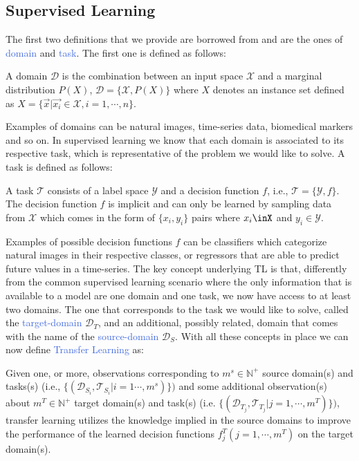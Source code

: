 \subsection{Supervised Learning}
The first two definitions that we provide are borrowed from \citet{zhuang2020comprehensive} and are the ones of \textcolor{RoyalBlue}{domain} and \textcolor{RoyalBlue}{task}. The first one is defined as follows:
\begin{definition}
	A domain $\mathcal{D}$ is the combination between an input space $\mathcal{X}$ and a marginal distribution $P(X)$, $\mathcal{D} = \{\mathcal{X},P(X)\}$ where $X$ denotes an instance set defined as $X=\{\vec{x}|\vec{x_i}\in \mathcal{X}, i =1, \cdots, n \}$.
\end{definition}
Examples of domains can be natural images, time-series data, biomedical markers and so on. In supervised learning we know that each domain is associated to its respective task, which is representative of the problem we would like to solve. A task is defined as follows:
\begin{definition}
	A task $\mathcal{T}$ consists of a label space $\mathcal{Y}$ and a decision function $f$, i.e., $\mathcal{T}=\{\mathcal{Y},f\}$. The decision function $f$ is implicit and can only be learned by sampling data from $\mathcal{X}$ which comes in the form of $\{x_i,y_i\}$ pairs where $x_i\inX$ and $y_i \in \mathcal{Y}$.
\end{definition}
Examples of possible decision functions $f$ can be classifiers which categorize natural images in their respective classes, or regressors that are able to predict future values in a time-series. 
The key concept underlying TL is that, differently from the common supervised learning scenario
where the only information that is available to a model are one domain and one task, we now have access to at least two domains. The one that corresponds to the task we would like to solve, called the \textcolor{RoyalBlue}{target-domain} $\mathcal{D}_T$, and an additional, possibly related, domain that comes with the name of the \textcolor{RoyalBlue}{source-domain} $\mathcal{D}_S$. With all these concepts in place we can now define \textcolor{RoyalBlue}{Transfer Learning} as:
\begin{definition}
Given one, or more, observations corresponding to $m^s \in \mathds{N}^{+}$ source domain(s) and tasks(s) (i.e., $\{(\mathcal{D}_{S}_{i}, \mathcal{T}_{S}_{i}|i=1\cdots,m^s)\})$ and some additional observation(s) about $m^T \in \mathds{N}^{+}$ target domain(s) and task(s) (i.e. $\{(\mathcal{D}_{T}_{j},\mathcal{T}_{T}_{j}|j=1,\cdots,m^T)\})$, transfer learning utilizes the knowledge implied in the source domains to improve the performance of the learned decision functions $f^{T}_j(j=1,\cdots,m^T)$ on the target domain(s).
\end{definition}
